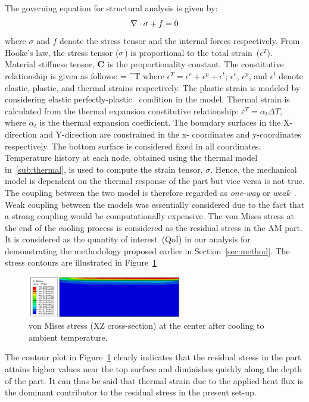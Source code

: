 The governing equation for structural analysis \cite{Megahed:2016} is given by:
%
\begin{equation}\label{eq_mechanical}
\nabla \cdot \mathbf{{\sigma}}+f = 0
\end{equation}
%
where $\sigma$ and $f$ denote the stress tensor and the internal forces respectively. From Hooke's law, the stress
tensor ($\mathbf{{\sigma}}$) is proportional to the total strain~($\epsilon^T$). Material stiffness tensor, $\mathbf{{C}}$ is the
proportionality constant. The constitutive relationship is given as follows:
%
\be
\mat{\sigma} = \epsilon^T
\ee
%
where $\epsilon^T = \epsilon^e + \epsilon^p+ \epsilon^t$; $\epsilon^e$, $\epsilon^p$, and $\epsilon^t$ denote elastic, 
plastic, and thermal strains respectively. The plastic strain is modeled by considering elastic 
perfectly-plastic~\cite{Zhao:2015} condition in the model. Thermal strain is calculated  from the thermal expansion 
constitutive relationship: $\varepsilon^T = \alpha_{t}\Delta T$, where $\alpha_t $ is the thermal expansion coefficient.
The boundary surfaces in the X-direction and Y-direction are constrained in the x-
coordinates and y-coordinates respectively. The bottom surface is considered fixed in all coordinates.
Temperature history at each node, obtained using the thermal model in~\ref{sub:thermal}, is used to
compute the strain tensor, $\sigma$. Hence, the mechanical model is dependent on the thermal response
of the part but vice versa is not true. The coupling between the two model is therefore regarded as \textit{one-way}
or \textit{weak}~\cite{Debroy:2017}. Weak coupling between the models was essentially considered due to the fact
that a strong coupling would be computationally expensive. The von Mises stress at the end of the cooling process
is considered as the residual stress in the AM part. It is considered as the quantity of interest~(QoI) in our analysis for 
demonstrating the methodology proposed earlier in Section~\ref{sec:method}. The stress contours are illustrated
in Figure~\ref{fig:subSmises} 
%
\begin{figure}[htbp]
\begin{center}
\includegraphics[width=0.6\textwidth]{./Figures/SMisesNom} 
\end{center}
\caption{von Mises stress (XZ cross-section) at the center after cooling to ambient temperature.}
\label{fig:subSmises}
\end{figure}
%
The contour plot in Figure~\ref{fig:subSmises} clearly indicates that the residual stress in the part attains higher
values near the top surface and diminishes quickly along the depth of the part. It can thus be said that thermal
strain due to the applied heat flux is the dominant contributor to the residual stress in the present set-up. 

